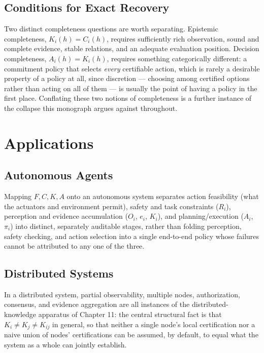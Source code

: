 \documentclass[11pt]{report}
\theoremstyle{definition}
\theoremstyle{plain}
\begin{document}
\chapter{Conditions for Exact Recovery}

Two distinct completeness questions are worth separating. Epistemic completeness, $K_i(h) = C_i(h)$, requires sufficiently rich observation, sound and complete evidence, stable relations, and an adequate evaluation position. Decision completeness, $A_i(h) = K_i(h)$, requires something categorically different: a commitment policy that selects \emph{every} certifiable action, which is rarely a desirable property of a policy at all, since discretion --- choosing among certified options rather than acting on all of them --- is usually the point of having a policy in the first place. Conflating these two notions of completeness is a further instance of the collapse this monograph argues against throughout.

\part{Applications}

\chapter{Autonomous Agents}

Mapping $F,C,K,A$ onto an autonomous system separates action feasibility (what the actuators and environment permit), safety and task constraints ($R_i$), perception and evidence accumulation ($O_i$, $e_i$, $K_i$), and planning/execution ($A_i$, $\pi_i$) into distinct, separately auditable stages, rather than folding perception, safety checking, and action selection into a single end-to-end policy whose failures cannot be attributed to any one of the three.

\chapter{Distributed Systems}

In a distributed system, partial observability, multiple nodes, authorization, consensus, and evidence aggregation are all instances of the distributed-knowledge apparatus of Chapter 11: the central structural fact is that $K_i \neq K_j \neq K_{ij}$ in general, so that neither a single node's local certification nor a naive union of nodes' certifications can be assumed, by default, to equal what the system as a whole can jointly establish.
\end{document}

